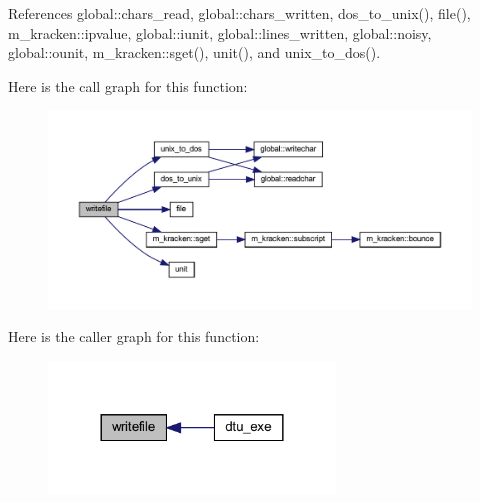 References global\+::chars\+\_\+read, global\+::chars\+\_\+written, dos\+\_\+to\+\_\+unix(), file(), m\+\_\+kracken\+::ipvalue, global\+::iunit, global\+::lines\+\_\+written, global\+::noisy, global\+::ounit, m\+\_\+kracken\+::sget(), unit(), and unix\+\_\+to\+\_\+dos().

Here is the call graph for this function\+:
\nopagebreak
\begin{figure}[H]
\begin{center}
\leavevmode
\includegraphics[width=350pt]{dtu_8f90_a6431a93cf13a3651f17078298d2d2ef9_cgraph}
\end{center}
\end{figure}
Here is the caller graph for this function\+:
\nopagebreak
\begin{figure}[H]
\begin{center}
\leavevmode
\includegraphics[width=216pt]{dtu_8f90_a6431a93cf13a3651f17078298d2d2ef9_icgraph}
\end{center}
\end{figure}

